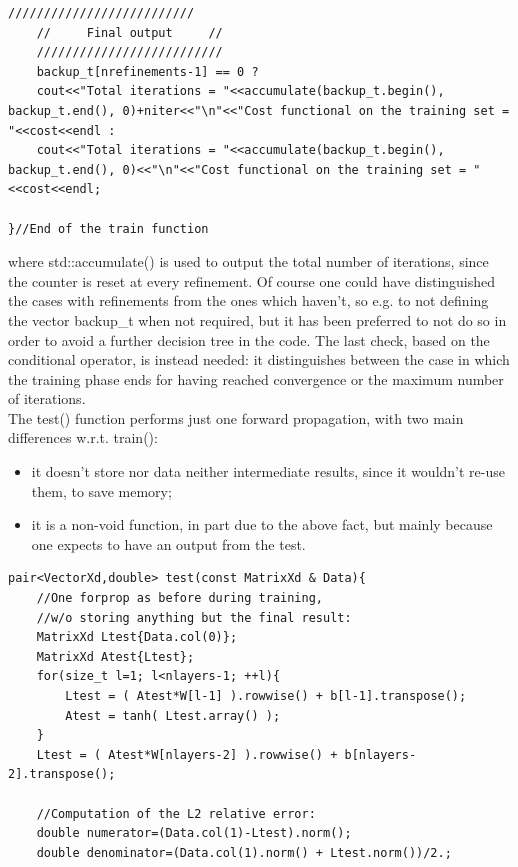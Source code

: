 \documentclass[12pt, a4paper]{report}
\theoremstyle{definition}
\begin{document}
{\begin{lstlisting}[frame=single, showstringspaces=false]
	//////////////////////////
	//     Final output     //
	//////////////////////////
	backup_t[nrefinements-1] == 0 ? 
	cout<<"Total iterations = "<<accumulate(backup_t.begin(), backup_t.end(), 0)+niter<<"\n"<<"Cost functional on the training set = "<<cost<<endl :
	cout<<"Total iterations = "<<accumulate(backup_t.begin(), backup_t.end(), 0)<<"\n"<<"Cost functional on the training set = "<<cost<<endl;

}//End of the train function
\end{lstlisting}
where {\ttfamily std::accumulate()} is used to output the total number of iterations, since the counter is reset at every refinement. Of course one could have distinguished the cases with refinements from the ones which haven't, so e.g. to not defining the vector {\ttfamily backup\_t} when not required, but it has been preferred to not do so in order to avoid a further decision tree in the code. The last check, based on the conditional operator, is instead needed: it distinguishes between the case in which the training phase ends for having reached convergence or the maximum number of iterations.\\
\newline \noindent The {\ttfamily test()} function performs just one forward propagation, with two main differences w.r.t. {\ttfamily train()}:
\begin{itemize}
	\item it doesn't store nor data neither intermediate results, since it wouldn't re-use them, to save memory;
	\item it is a non-void function, in part due to the above fact, but mainly because one expects to have an output from the test.
\end{itemize}
\begin{lstlisting}[frame=single]
pair<VectorXd,double> test(const MatrixXd & Data){
	//One forprop as before during training,
	//w/o storing anything but the final result:
	MatrixXd Ltest{Data.col(0)};
	MatrixXd Atest{Ltest};
	for(size_t l=1; l<nlayers-1; ++l){
		Ltest = ( Atest*W[l-1] ).rowwise() + b[l-1].transpose();
		Atest = tanh( Ltest.array() );	
	}
	Ltest = ( Atest*W[nlayers-2] ).rowwise() + b[nlayers-2].transpose();
	
	//Computation of the L2 relative error:
	double numerator=(Data.col(1)-Ltest).norm();
	double denominator=(Data.col(1).norm() + Ltest.norm())/2.;
	

\end{lstlisting}}
\end{document}
